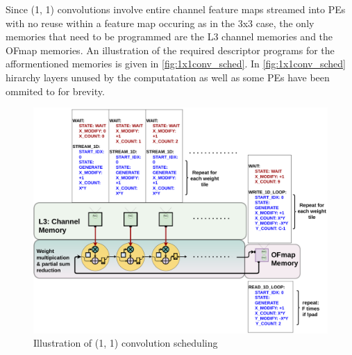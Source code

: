 Since (1, 1) convolutions involve entire channel feature maps streamed into PEs
with no reuse within a feature map occuring as in the 3x3 case, the only
memories that need to be programmed are the L3 channel memories and the OFmap
memories. An illustration of the required descriptor programs for the
afformentioned memories is given in \autoref{fig:1x1conv_sched}. In
\autoref{fig:1x1conv_sched} hirarchy layers unused by the computatation 
as well as some PEs have been ommited to for brevity.

\begin{figure}[ht]
    \centering
    \includegraphics[scale=0.495]{fig/1x1conv_sched.pdf}
    \caption{Illustration of (1, 1) convolution scheduling}
    \label{fig:1x1conv_sched}
\end{figure}


